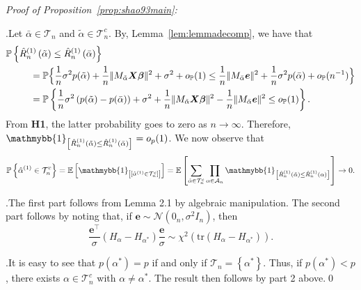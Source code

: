 \documentclass[11pt, letter paper]{article}
\newcommand{\1}{\mathmybb{1}}
\newcommand{\0}{\emptyset}
\newcommand{\prob}{\mathbb{P}}
\newcommand{\Ep}[1]{\mathbb{E}\left[ #1 \right]}
\newcommand{\paren}[1]{\left(#1 \right)}
\newcommand{\sqbr}[1]{\left[#1 \right]}
\newcommand{\set}[1]{\left\{ #1 \right\}}
\newcommand{\norm}[1]{|\hspace{-1pt}|#1 |\hspace{-1pt}|}
\newcommand{\normsq}[1]{\norm{#1}^{2}}
\newcommand{\ind}[1]{\mathmybb{1}_{\sqbr{#1}}}
\newcommand{\Acal}{\mathcal{A}_{n}}
\newcommand{\Tcal}{\mathcal{T}_{n}}
\newcommand{\Ncal}{\mathcal{N}}
\newcommand{\X}{\boldsymbol{X}}
\newcommand{\e}{\boldsymbol{e}}
\newcommand{\bbeta}{\boldsymbol{\beta}}
\newcommand{\alphahat}[1]{\hat{\alpha}^{#1}}
\newcommand{\alphatilde}{\tilde{\alpha}}
\newcommand{\alphabar}{\bar{\alpha}}
\newcommand{\loocv}[1]{\hat{R}^{(1)}_{n}\paren{#1}}
\begin{document}
\begin{myproofbox}
    \textit{Proof of Proposition~\ref{prop:shao93main}: }

    .\quad Let \(\alphabar\in \Tcal\) and \(\alphatilde\in\Tcal^{c}\). By, Lemma~\ref{lem:lemmadecomp}, we have that
    \begin{align*}
        \prob&\set{\loocv{\alphatilde}\leq \loocv{\alphabar}}\\
        &\qquad = \prob\Big\{\frac{1}{n}\sigma^{2}p(\alphatilde) + \frac{1}{n}\normsq{M_{\alphatilde}\X\bbeta} + \sigma^{2} + o_{\prob}(1) \leq \frac{1}{n}\normsq{M_{\alphabar}\e} + \frac{1}{n}\sigma^{2}p(\alphabar) + o_{\prob}(n^{-1})\Big\}\\
        &\qquad= \prob\set{\frac{1}{n}\sigma^{2}\paren{p(\alphatilde) - p(\alphabar)} + \sigma^{2} + \frac{1}{n}\normsq{M_{\alphatilde}\X\bbeta} - \frac{1}{n}\normsq{M_{\alphabar}\e}\leq o_{\prob}(1)}.
    \end{align*}
    From \textbf{H1}, the latter probability goes to zero as \(n\to\infty\). Therefore, \(\ind{\loocv{\alphatilde}\leq \loocv{\alphabar}} = o_{p}(1)\). We now observe that
    \[\prob\set{\alphahat{(1)}\in\Tcal^{c}} = \Ep{\ind{[\alphahat{(1)}\in\Tcal^{c}]}} = \Ep{\sum_{\alphatilde\in\Tcal^{c}}\prod_{\alpha\in\Acal} \ind{\loocv{\alphatilde}\leq \loocv{\alpha}}} \to 0.\]

    .\quad The first part follows from Lemma 2.1 by algebraic manipulation. The second part follows by noting that, if \(\e\sim\Ncal(0_{n}, \sigma^{2}I_{n})\), then \[\frac{\e^{\top}}{\sigma}\paren{H_{\alpha} - H_{\alpha^{*}}}\frac{\e}{\sigma}\sim\chi^{2}\paren{\mathrm{tr}\paren{H_{\alpha}-H_{\alpha^{*}}}}.\]

    .\quad It is easy to see that \(p(\alpha^{*}) = p\) if and only if \(\Tcal=\set{\alpha^{*}}\). Thus, if \(p(\alpha^{*}) < p\), there exists \(\alpha\in\Tcal^{c}\) with \(\alpha\neq \alpha^{*}\). The result then follows by part 2 above.\qed{}
\end{myproofbox}

\end{document}
